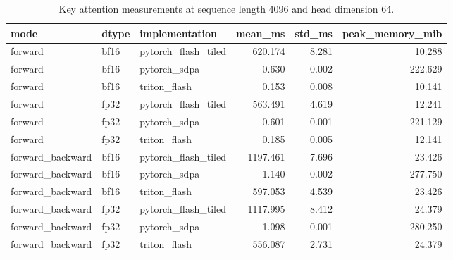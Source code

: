 \begin{table}
\caption{Key attention measurements at sequence length 4096 and head dimension 64.}
\label{tab:attention-measured}
\begin{tabular}{lllrrr}
\toprule
mode & dtype & implementation & mean_ms & std_ms & peak_memory_mib \\
\midrule
forward & bf16 & pytorch_flash_tiled & 620.174 & 8.281 & 10.288 \\
forward & bf16 & pytorch_sdpa & 0.630 & 0.002 & 222.629 \\
forward & bf16 & triton_flash & 0.153 & 0.008 & 10.141 \\
forward & fp32 & pytorch_flash_tiled & 563.491 & 4.619 & 12.241 \\
forward & fp32 & pytorch_sdpa & 0.601 & 0.001 & 221.129 \\
forward & fp32 & triton_flash & 0.185 & 0.005 & 12.141 \\
forward_backward & bf16 & pytorch_flash_tiled & 1197.461 & 7.696 & 23.426 \\
forward_backward & bf16 & pytorch_sdpa & 1.140 & 0.002 & 277.750 \\
forward_backward & bf16 & triton_flash & 597.053 & 4.539 & 23.426 \\
forward_backward & fp32 & pytorch_flash_tiled & 1117.995 & 8.412 & 24.379 \\
forward_backward & fp32 & pytorch_sdpa & 1.098 & 0.001 & 280.250 \\
forward_backward & fp32 & triton_flash & 556.087 & 2.731 & 24.379 \\
\bottomrule
\end{tabular}
\end{table}
